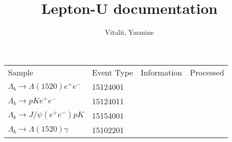 \documentclass[11pt, oneside]{article}   	%
\title{Lepton-U documentation}
\author{Vitalii, Yasmine}
\begin{document}
\maketitle





\begin{table}[h]
\centering
\begin{tabular}{llcc}
Sample& Event Type  & Information & Processed \\


$\Lambda_b\to \Lambda(1520) e^+e^-$ & 15124001 & & \\
$\Lambda_b\to pK e^+e^-$&15124011  & & \\
$\Lambda_b\to J/\psi (e^+e^-)pK $&15154001  & & \\
$\Lambda_b\to \Lambda(1520) \gamma $ &15102201 & & \\

\end{tabular}

\end{table}
\end{document}
